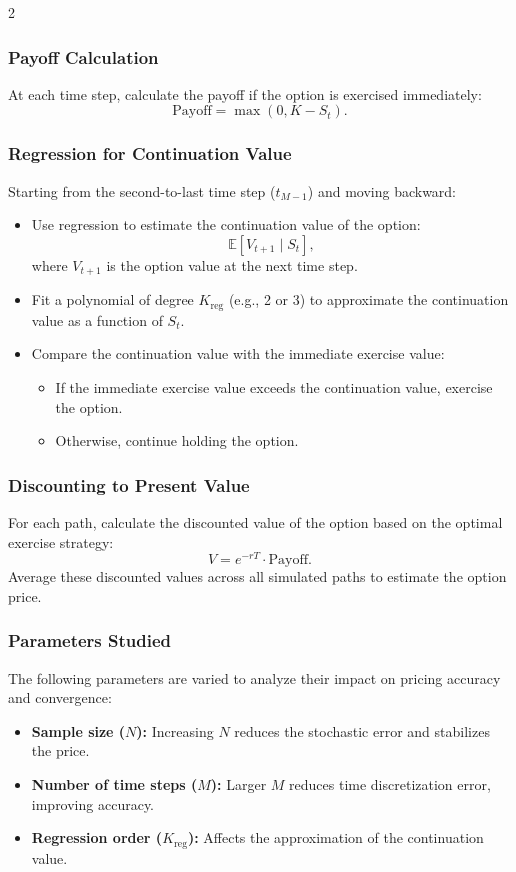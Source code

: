 \begin{multicols}{2}
\subsubsection{Payoff Calculation}
At each time step, calculate the payoff if the option is exercised immediately:
\[
\text{Payoff} = \max(0, K - S_t).
\]

\subsubsection{Regression for Continuation Value}
Starting from the second-to-last time step (\(t_{M-1}\)) and moving backward:
\begin{itemize}
    \item Use regression to estimate the continuation value of the option:
    \[
    \mathbb{E}[V_{t+1} \mid S_t],
    \]
    where \(V_{t+1}\) is the option value at the next time step.
    \item Fit a polynomial of degree \(K_{\text{reg}}\) (e.g., 2 or 3) to approximate the continuation value as a function of \(S_t\).
    \item Compare the continuation value with the immediate exercise value:
    \begin{itemize}
        \item If the immediate exercise value exceeds the continuation value, exercise the option.
        \item Otherwise, continue holding the option.
    \end{itemize}
\end{itemize}

\subsubsection{Discounting to Present Value}
For each path, calculate the discounted value of the option based on the optimal exercise strategy:
\[
V = e^{-rT} \cdot \text{Payoff}.
\]
Average these discounted values across all simulated paths to estimate the option price.

\subsubsection{Parameters Studied}
The following parameters are varied to analyze their impact on pricing accuracy and convergence:
\begin{itemize}
    \item \textbf{Sample size (\(N\)):} Increasing \(N\) reduces the stochastic error and stabilizes the price.
    \item \textbf{Number of time steps (\(M\)):} Larger \(M\) reduces time discretization error, improving accuracy.
    \item \textbf{Regression order (\(K_{\text{reg}}\)):} Affects the approximation of the continuation value.
\end{itemize}


\end{multicols}
